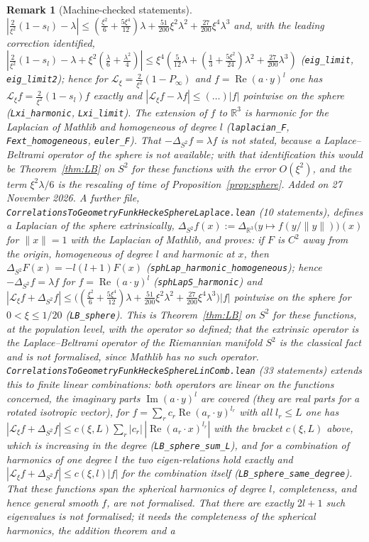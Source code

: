 \documentclass[11pt,a4paper]{article}
\theoremstyle{stmt}
\theoremstyle{defn}
\theoremstyle{rmk}
\newtheorem{remark}[theorem]{Remark}
\numberwithin{equation}{section}
\newcommand{\R}{\mathbb{R}}
\begin{document}
{\begin{remark}[Machine-checked statements]
$|\tfrac2{\xi^2}(1-s_l)-\lambda|\le(\tfrac{\xi^2}6+\tfrac{5\xi^4}{12})\lambda+\tfrac{51}{200}\xi^2\lambda^2+\tfrac{27}{200}\xi^4\lambda^3$ and, with the leading correction identified, $|\tfrac2{\xi^2}(1-s_l)-\lambda+\xi^2(\tfrac\lambda6+\tfrac{\lambda^2}4)|\le\xi^4(\tfrac5{12}\lambda+(\tfrac13+\tfrac{5\xi^2}{24})\lambda^2+\tfrac{27}{200}\lambda^3)$ (\texttt{eig\_limit}, \texttt{eig\_limit2}); hence for $\mathcal L_\xi=\tfrac2{\xi^2}(1-P_\infty)$ and $f=\operatorname{Re}(a\cdot y)^l$ one has $\mathcal L_\xi f=\tfrac2{\xi^2}(1-s_l)f$ exactly and $|\mathcal L_\xi f-\lambda f|\le(\dots)|f|$ pointwise on the sphere (\texttt{Lxi\_harmonic}, \texttt{Lxi\_limit}). The extension of $f$ to $\R^3$ is harmonic for the Laplacian of Mathlib and homogeneous of degree $l$ (\texttt{laplacian\_F}, \texttt{Fext\_homogeneous}, \texttt{euler\_F}). That $-\Delta_{S^2}f=\lambda f$ is not stated, because a Laplace--Beltrami operator of the sphere is not available; with that identification this would be Theorem~\ref{thm:LB} on $S^2$ for these functions with the error $O(\xi^2)$, and the term $\xi^2\lambda/6$ is the rescaling of time of Proposition~\ref{prop:sphere}. \emph{Added on 27 November 2026.} A further file, \texttt{CorrelationsToGeometryFunkHeckeSphereLaplace.lean} (10 statements), defines a Laplacian of the sphere extrinsically, $\Delta_{S^2}f(x):=\Delta_{\R^3}\big(y\mapsto f(y/\|y\|)\big)(x)$ for $\|x\|=1$ with the Laplacian of Mathlib, and proves: if $F$ is $C^2$ away from the origin, homogeneous of degree $l$ and harmonic at $x$, then $\Delta_{S^2}F(x)=-l(l+1)F(x)$ (\texttt{sphLap\_harmonic\_homogeneous}); hence $-\Delta_{S^2}f=\lambda f$ for $f=\operatorname{Re}(a\cdot y)^l$ (\texttt{sphLapS\_harmonic}) and $|\mathcal L_\xi f+\Delta_{S^2}f|\le\big((\tfrac{\xi^2}6+\tfrac{5\xi^4}{12})\lambda+\tfrac{51}{200}\xi^2\lambda^2+\tfrac{27}{200}\xi^4\lambda^3\big)|f|$ pointwise on the sphere for $0<\xi\le1/20$ (\texttt{LB\_sphere}). This is Theorem~\ref{thm:LB} on $S^2$ for these functions, at the population level, with the operator so defined; that the extrinsic operator is the Laplace--Beltrami operator of the Riemannian manifold $S^2$ is the classical fact and is not formalised, since Mathlib has no such operator. \texttt{CorrelationsToGeometryFunkHeckeSphereLinComb.lean} (33 statements) extends this to finite linear combinations: both operators are linear on the functions concerned, the imaginary parts $\operatorname{Im}(a\cdot y)^l$ are covered (they are real parts for a rotated isotropic vector), for $f=\sum_rc_r\operatorname{Re}(a_r\cdot y)^{l_r}$ with all $l_r\le L$ one has $|\mathcal L_\xi f+\Delta_{S^2}f|\le c(\xi,L)\sum_r|c_r|\,|\operatorname{Re}(a_r\cdot x)^{l_r}|$ with the bracket $c(\xi,L)$ above, which is increasing in the degree (\texttt{LB\_sphere\_sum\_L}), and for a combination of harmonics of one degree $l$ the two eigen-relations hold exactly and $|\mathcal L_\xi f+\Delta_{S^2}f|\le c(\xi,l)|f|$ for the combination itself (\texttt{LB\_sphere\_same\_degree}). That these functions span the spherical harmonics of degree $l$, completeness, and hence general smooth $f$, are not formalised. That there are exactly $2l+1$ such eigenvalues is not formalised; it needs the completeness of the spherical harmonics, the addition theorem and a 
\end{remark}}
\end{document}
